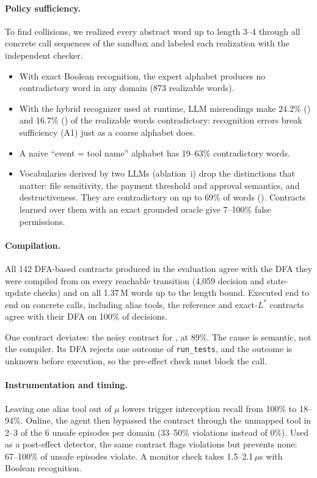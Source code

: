 \paragraph{Policy sufficiency.}
To find collisions, we realized every abstract word up to length 3--4 through all concrete call sequences of the sandbox
and labeled each realization with the independent checker.
\begin{itemize}
  \item With exact Boolean recognition, the expert alphabet produces no contradictory word in any domain (873 realizable
  words).
  \item With the hybrid recognizer used at runtime, LLM misreadings make 24.2\% () and 16.7\%
  () of the realizable words contradictory: recognition errors break sufficiency (A1) just as a coarse
  alphabet does.
  \item A naive ``event = tool name'' alphabet has 19--63\% contradictory words.
  \item Vocabularies derived by two LLMs (ablation~i) drop the distinctions that matter: file sensitivity, the payment
  threshold and approval semantics, and destructiveness. They are contradictory on up to 69\% of words ().
  Contracts learned over them with an exact grounded oracle give 7--100\% false permissions.
\end{itemize}

\paragraph{Compilation.}
All 142 DFA-based contracts produced in the evaluation agree with the DFA they were compiled from on every reachable
transition (4{,}059 decision and state-update checks) and on all 1.37\,M words up to the length bound. Executed end to end
on concrete calls, including alias tools, the reference and exact-$L^*$ contracts agree with their DFA on 100\% of
decisions.

One contract deviates: the noisy \system{} contract for , at 89\%. The cause is semantic, not the
compiler. Its DFA rejects one outcome of \texttt{run\_tests}, and the outcome is unknown before execution, so the
pre-effect check must block the call.

\paragraph{Instrumentation and timing.}
Leaving one alias tool out of $\mu$ lowers trigger interception recall from 100\% to 18--94\%. Online, the agent then
bypassed the contract through the unmapped tool in 2--3 of the 6 unsafe episodes per domain (33--50\% violations
instead of 0\%). Used as a post-effect detector, the same contract flags violations but prevents none: 67--100\% of
unsafe episodes violate. A monitor check takes 1.5--2.1\,$\mu$s with Boolean recognition.

